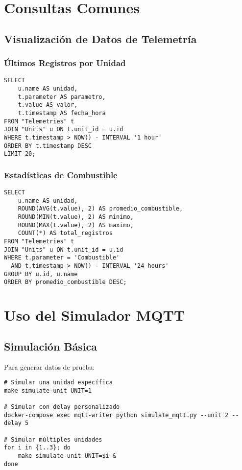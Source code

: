\section{Consultas Comunes}

\subsection{Visualización de Datos de Telemetría}

\subsubsection{Últimos Registros por Unidad}
\begin{verbatim}
SELECT 
    u.name AS unidad,
    t.parameter AS parametro,
    t.value AS valor,
    t.timestamp AS fecha_hora
FROM "Telemetries" t
JOIN "Units" u ON t.unit_id = u.id
WHERE t.timestamp > NOW() - INTERVAL '1 hour'
ORDER BY t.timestamp DESC
LIMIT 20;
\end{verbatim}

\subsubsection{Estadísticas de Combustible}
\begin{verbatim}
SELECT 
    u.name AS unidad,
    ROUND(AVG(t.value), 2) AS promedio_combustible,
    ROUND(MIN(t.value), 2) AS minimo,
    ROUND(MAX(t.value), 2) AS maximo,
    COUNT(*) AS total_registros
FROM "Telemetries" t
JOIN "Units" u ON t.unit_id = u.id
WHERE t.parameter = 'Combustible'
  AND t.timestamp > NOW() - INTERVAL '24 hours'
GROUP BY u.id, u.name
ORDER BY promedio_combustible DESC;
\end{verbatim}

\section{Uso del Simulador MQTT}

\subsection{Simulación Básica}

Para generar datos de prueba:

\begin{verbatim}
# Simular una unidad específica
make simulate-unit UNIT=1

# Simular con delay personalizado
docker-compose exec mqtt-writer python simulate_mqtt.py --unit 2 --delay 5

# Simular múltiples unidades
for i in {1..3}; do
    make simulate-unit UNIT=$i &
done
\end{verbatim}

